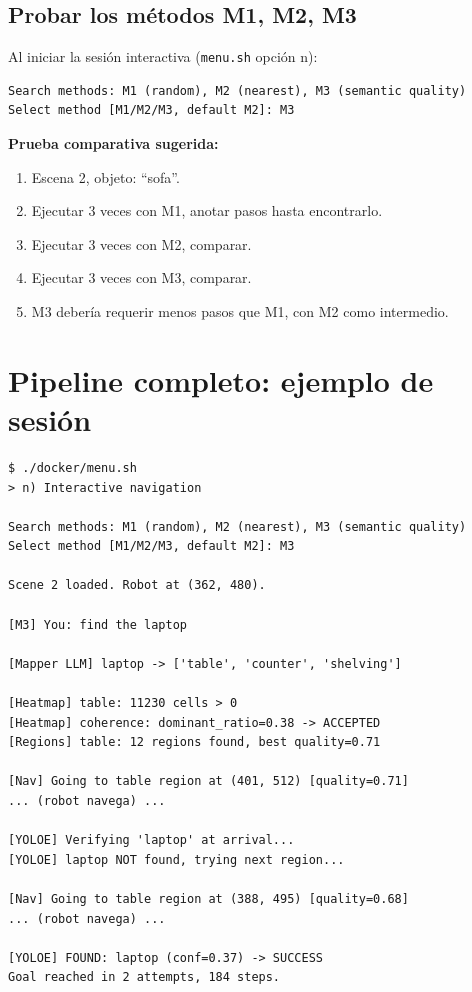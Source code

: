 \documentclass[11pt,a4paper]{article}
\begin{document}
\subsection{Probar los métodos M1, M2, M3}

Al iniciar la sesión interactiva (\texttt{menu.sh} opción n):

\begin{lstlisting}
Search methods: M1 (random), M2 (nearest), M3 (semantic quality)
Select method [M1/M2/M3, default M2]: M3
\end{lstlisting}

\textbf{Prueba comparativa sugerida:}
\begin{enumerate}
  \item Escena 2, objeto: ``sofa''.
  \item Ejecutar 3 veces con M1, anotar pasos hasta encontrarlo.
  \item Ejecutar 3 veces con M2, comparar.
  \item Ejecutar 3 veces con M3, comparar.
  \item M3 debería requerir menos pasos que M1, con M2 como intermedio.
\end{enumerate}

\section{Pipeline completo: ejemplo de sesión}

\begin{lstlisting}
$ ./docker/menu.sh
> n) Interactive navigation

Search methods: M1 (random), M2 (nearest), M3 (semantic quality)
Select method [M1/M2/M3, default M2]: M3

Scene 2 loaded. Robot at (362, 480).

[M3] You: find the laptop

[Mapper LLM] laptop -> ['table', 'counter', 'shelving']

[Heatmap] table: 11230 cells > 0
[Heatmap] coherence: dominant_ratio=0.38 -> ACCEPTED
[Regions] table: 12 regions found, best quality=0.71

[Nav] Going to table region at (401, 512) [quality=0.71]
... (robot navega) ...

[YOLOE] Verifying 'laptop' at arrival...
[YOLOE] laptop NOT found, trying next region...

[Nav] Going to table region at (388, 495) [quality=0.68]
... (robot navega) ...

[YOLOE] FOUND: laptop (conf=0.37) -> SUCCESS
Goal reached in 2 attempts, 184 steps.
\end{lstlisting}
\end{document}
